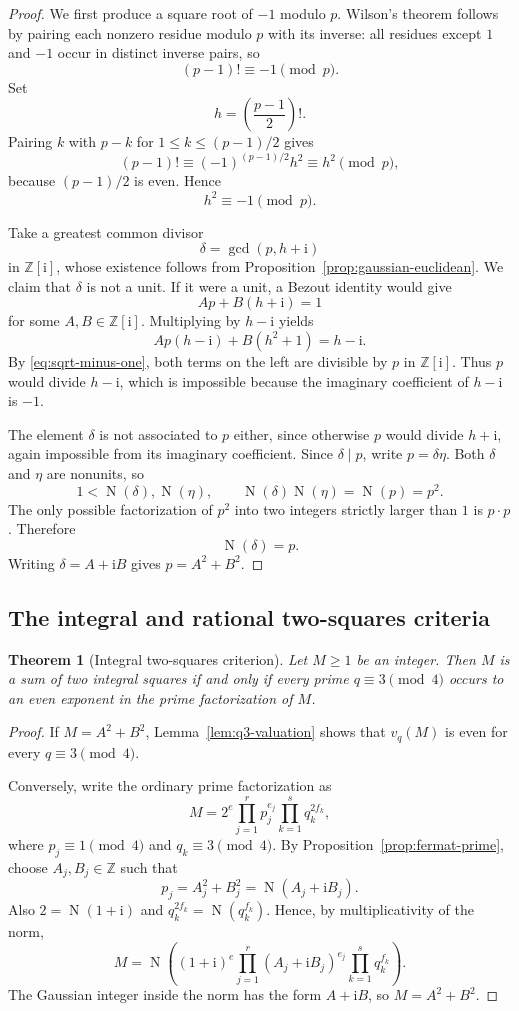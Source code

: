 \documentclass[11pt,a4paper]{article}
\numberwithin{equation}{section}
\newtheorem{theorem}{Theorem}[section]
\theoremstyle{definition}
\newcommand{\Z}{\mathbb{Z}}
\newcommand{\N}{\operatorname{N}}
\newcommand{\ii}{\mathrm{i}}
\begin{document}
\begin{proof}
We first produce a square root of $-1$ modulo $p$. Wilson's theorem follows by pairing each nonzero residue modulo $p$ with its inverse: all residues except $1$ and $-1$ occur in distinct inverse pairs, so
\[
 (p-1)!\equiv-1\pmod p.
\]
Set
\[
 h=\left(\frac{p-1}{2}\right)!.
\]
Pairing $k$ with $p-k$ for $1\le k\le(p-1)/2$ gives
\[
 (p-1)!
 \equiv(-1)^{(p-1)/2}h^2
 \equiv h^2\pmod p,
\]
because $(p-1)/2$ is even. Hence
\begin{equation}
 h^2\equiv-1\pmod p.
 \label{eq:sqrt-minus-one}
\end{equation}

Take a greatest common divisor
\[
 \delta=\gcd(p,h+\ii)
\]
in $\Z[\ii]$, whose existence follows from Proposition~\ref{prop:gaussian-euclidean}. We claim that $\delta$ is not a unit. If it were a unit, a Bezout identity would give
\[
 Ap+B(h+\ii)=1
\]
for some $A,B\in\Z[\ii]$. Multiplying by $h-\ii$ yields
\[
 Ap(h-\ii)+B(h^2+1)=h-\ii.
\]
By \eqref{eq:sqrt-minus-one}, both terms on the left are divisible by $p$ in $\Z[\ii]$. Thus $p$ would divide $h-\ii$, which is impossible because the imaginary coefficient of $h-\ii$ is $-1$.

The element $\delta$ is not associated to $p$ either, since otherwise $p$ would divide $h+\ii$, again impossible from its imaginary coefficient. Since $\delta\mid p$, write $p=\delta\eta$. Both $\delta$ and $\eta$ are nonunits, so
\[
 1<\N(\delta),\N(\eta),
 \qquad
 \N(\delta)\N(\eta)=\N(p)=p^2.
\]
The only possible factorization of $p^2$ into two integers strictly larger than $1$ is $p\cdot p$. Therefore
\[
 \N(\delta)=p.
\]
Writing $\delta=A+\ii B$ gives $p=A^2+B^2$.
\end{proof}

\subsection{The integral and rational two-squares criteria}

\begin{theorem}[Integral two-squares criterion]
\label{thm:integer-two-squares}
Let $M\ge1$ be an integer. Then $M$ is a sum of two integral squares if and only if every prime $q\equiv3\pmod4$ occurs to an even exponent in the prime factorization of $M$.
\end{theorem}

\begin{proof}
If $M=A^2+B^2$, Lemma~\ref{lem:q3-valuation} shows that $v_q(M)$ is even for every $q\equiv3\pmod4$.

Conversely, write the ordinary prime factorization as
\[
 M=2^e
 \prod_{j=1}^{r}p_j^{e_j}
 \prod_{k=1}^{s}q_k^{2f_k},
\]
where $p_j\equiv1\pmod4$ and $q_k\equiv3\pmod4$. By Proposition~\ref{prop:fermat-prime}, choose $A_j,B_j\in\Z$ such that
\[
 p_j=A_j^2+B_j^2=\N(A_j+\ii B_j).
\]
Also $2=\N(1+\ii)$ and $q_k^{2f_k}=\N(q_k^{f_k})$. Hence, by multiplicativity of the norm,
\[
 M=
 \N\!\left(
 (1+\ii)^e
 \prod_{j=1}^{r}(A_j+\ii B_j)^{e_j}
 \prod_{k=1}^{s}q_k^{f_k}
 \right).
\]
The Gaussian integer inside the norm has the form $A+\ii B$, so $M=A^2+B^2$.
\end{proof}
\end{document}
